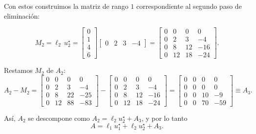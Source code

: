 Con estos construimos la matriz de rango $1$ correspondiente al segundo paso de eliminación:

\[
M_2 = \ell_2\, u_2^\star =
\begin{bmatrix} 0 \\ 1 \\ 4 \\ 6 \end{bmatrix}
\begin{bmatrix} 0 & 2 & 3 & -4 \end{bmatrix}
=
\begin{bmatrix}
0 & 0 & 0 &  0 \\
0 & 2 & 3 & -4 \\
0 & 8 & 12 & -16 \\
0 & 12 & 18 & -24
\end{bmatrix}.
\]

Restamos $M_2$ de $A_2$:
\[
A_2 - M_2 =
\begin{bmatrix}
0 & 0 &  0 &  0 \\
0 & 2 &  3 & -4 \\
0 & 8 & 22 & -25 \\
0 & 12 & 88 & -83
\end{bmatrix}
-
\begin{bmatrix}
0 & 0 & 0 &  0 \\
0 & 2 & 3 & -4 \\
0 & 8 & 12 & -16 \\
0 & 12 & 18 & -24
\end{bmatrix}
=
\begin{bmatrix}
0 & 0 &  0 &  0 \\
0 & 0 &  0 &  0 \\
0 & 0 & 10 & -9 \\
0 & 0 & 70 & -59
\end{bmatrix}
\equiv A_3.
\]

Así, $A_2$ se descompone como $A_2 = \ell_2 u_2^\star + A_3$, y por lo tanto
\[
A = \ell_1 u_1^\star + \ell_2 u_2^\star + A_3.
\]

